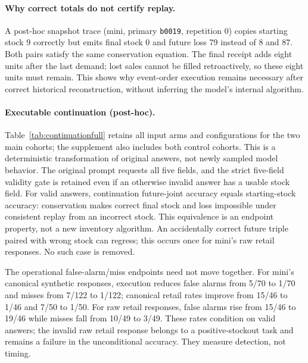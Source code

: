 \paragraph{Why correct totals do not certify replay.}
A post-hoc snapshot trace (mini, primary \texttt{b0019}, repetition 0) copies
starting stock 9 correctly but emits final stock 0 and future loss 79 instead
of 8 and 87. Both pairs satisfy the same conservation equation. The final
receipt adds eight units after the last demand; lost sales cannot be filled
retroactively, so these eight units must remain. This shows why event-order
execution remains necessary after correct historical reconstruction, without
inferring the model's internal algorithm.

\paragraph{Executable continuation (post-hoc).}
\label{app:continuation}
Table~\ref{tab:continuationfull} retains all input arms and configurations for
the two main cohorts; the supplement also includes both control cohorts.
This is a deterministic transformation of original answers, not newly sampled
model behavior. The original prompt requests all five fields, and the strict
five-field validity gate is retained even if an otherwise invalid answer has a
usable stock field. For valid answers, continuation future-joint accuracy equals
starting-stock accuracy: conservation makes correct final stock and loss
impossible under consistent replay from an incorrect stock. This equivalence is
an endpoint property, not a new inventory algorithm. An accidentally correct
future triple paired with wrong stock can regress; this occurs once for mini's
raw retail responses. No such case is removed.

The operational false-alarm/miss endpoints need not move together. For mini's
canonical synthetic responses, execution reduces false alarms from 5/70 to 1/70
and misses from 7/122 to 1/122; canonical retail rates improve from 15/46 to 1/46
and 7/50 to 1/50. For raw retail responses, false alarms rise from 15/46 to 19/46
while misses fall from 10/49 to 3/49. These rates condition on valid answers;
the invalid raw retail response belongs to a positive-stockout task and remains
a failure in the unconditional accuracy. They measure detection, not timing.


